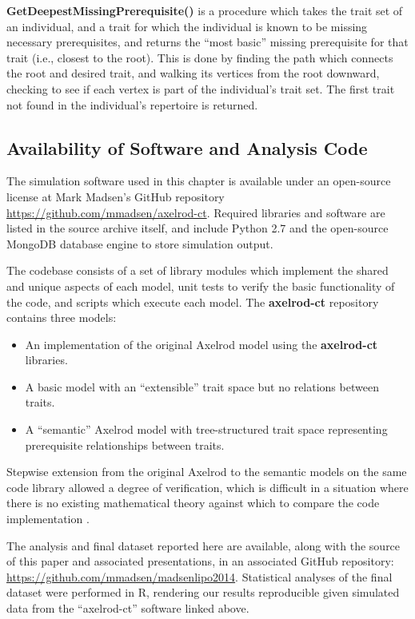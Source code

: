 \textbf{GetDeepestMissingPrerequisite()} is a procedure which takes the
trait set of an individual, and a trait for which the individual is
known to be missing necessary prerequisites, and returns the ``most
basic'' missing prerequisite for that trait (i.e., closest to the root).
This is done by finding the path which connects the root and desired
trait, and walking its vertices from the root downward, checking to see
if each vertex is part of the individual's trait set. The first trait
not found in the individual's repertoire is returned.

\subsection{Availability of Software and Analysis
Code}\label{availability-of-software-and-analysis-code}

The simulation software used in this chapter is available under an
open-source license at Mark Madsen's GitHub repository
\url{https://github.com/mmadsen/axelrod-ct}. Required libraries and
software are listed in the source archive itself, and include Python 2.7
and the open-source MongoDB database engine to store simulation output.

The codebase consists of a set of library modules which implement the
shared and unique aspects of each model, unit tests to verify the basic
functionality of the code, and scripts which execute each model. The
\textbf{axelrod-ct} repository contains three models:

\begin{itemize}
\item
  An implementation of the original Axelrod model using the
  \textbf{axelrod-ct} libraries.
\item
  A basic model with an ``extensible'' trait space but no relations
  between traits.
\item
  A ``semantic'' Axelrod model with tree-structured trait space
  representing prerequisite relationships between traits.
\end{itemize}

Stepwise extension from the original Axelrod to the semantic models on
the same code library allowed a degree of verification, which is
difficult in a situation where there is no existing mathematical theory
against which to compare the code implementation
\citep{national2012Assessing}.

The analysis and final dataset reported here are available, along with
the source of this paper and associated presentations, in an associated
GitHub repository: \url{https://github.com/mmadsen/madsenlipo2014}.
Statistical analyses of the final dataset were performed in R, rendering
our results reproducible given simulated data from the ``axelrod-ct''
software linked above.

